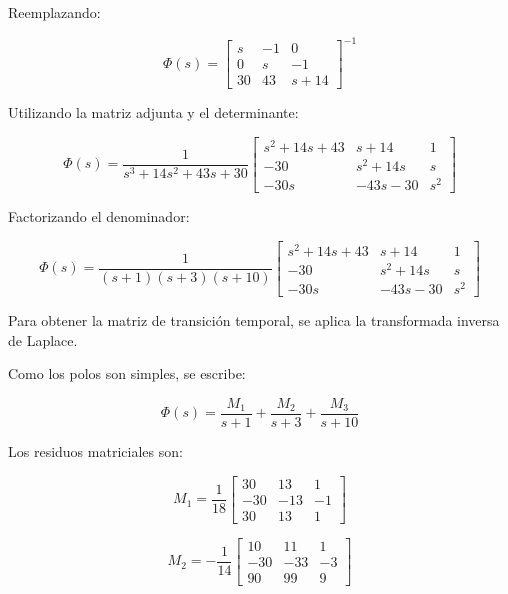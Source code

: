 \documentclass[12pt,a4paper]{article}
\begin{document}
Reemplazando:

\begin{equation}\Phi(s)=\begin{bmatrix}s&-1&0\\0&s&-1\\30&43&s+14\end{bmatrix}^{-1}\end{equation}

Utilizando la matriz adjunta y el determinante:

\begin{equation}\Phi(s)=\frac{1}{s^3+14s^2+43s+30} \begin{bmatrix}s^2+14s+43&s+14&1\\-30&s^2+14s&s\\-30s&-43s-30&s^2\end{bmatrix}\end{equation}

Factorizando el denominador:

\begin{equation}\boxed{\Phi(s)=\frac{1}{(s+1)(s+3)(s+10)} \begin{bmatrix}s^2+14s+43&s+14&1\\-30&s^2+14s&s\\-30s&-43s-30&s^2\end{bmatrix}}\end{equation}

Para obtener la matriz de transición temporal, se aplica la transformada inversa de Laplace.

Como los polos son simples, se escribe:

\begin{equation}\Phi(s)=\frac{M_1}{s+1}+\frac{M_2}{s+3}+\frac{M_3}{s+10}\end{equation}

Los residuos matriciales son:

\begin{equation}M_1=\frac{1}{18} \begin{bmatrix}30&13&1\\-30&-13&-1\\30&13&1\end{bmatrix}\end{equation}

\begin{equation}M_2=-\frac{1}{14} \begin{bmatrix}10&11&1\\-30&-33&-3\\90&99&9\end{bmatrix}\end{equation}
\end{document}
